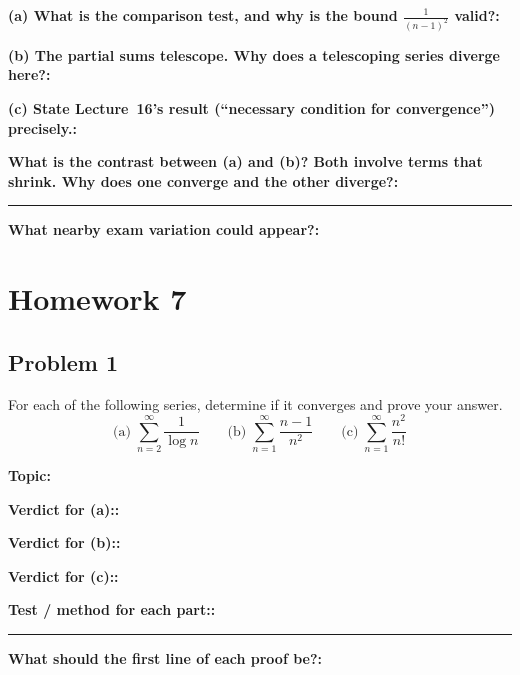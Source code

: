 \documentclass[12pt]{article}
\newcommand{\fillfield}[1]{%
  \par\noindent\textbf{#1:}\enspace\hrulefill\par\vspace{3pt}%
}
\newcommand{\fillfieldlong}[1]{%
  \par\noindent\textbf{#1:}\par\vspace{1.5cm}%
  \noindent\rule{\linewidth}{0.35pt}\par\vspace{4pt}%
}
\begin{document}
\begin{tcolorbox}[
  enhanced, breakable,
  colback  = reflectcyan,
  colframe = cyan!55!black,
  fonttitle = \bfseries,
  title = {\textsc{Reflection \& Variation}}
]
\fillfield{(a) What is the comparison test, and why is the bound $\frac{1}{(n-1)^2}$ valid?}
\fillfield{(b) The partial sums telescope. Why does a telescoping series diverge here?}
\fillfield{(c) State Lecture~16's result (``necessary condition for convergence'') precisely.}
\fillfieldlong{What is the contrast between (a) and (b)? Both involve terms that shrink. Why does one converge and the other diverge?}
\fillfield{What nearby exam variation could appear?}
\end{tcolorbox}

\newpage
\section{Homework 7}

\newpage
\subsection{Problem 1}

\begin{tcolorbox}[
  enhanced, breakable,
  colback  = probblue,
  colframe = blue!55!black,
  fonttitle = \bfseries,
  title = {\textsc{Problem Statement}\hfill Homework 7, Problem 1}
]
For each of the following series, determine if it converges and prove your answer.
\[
  \text{(a)}\;\sum_{n=2}^{\infty}\frac{1}{\log n}
  \qquad
  \text{(b)}\;\sum_{n=1}^{\infty}\frac{n-1}{n^2}
  \qquad
  \text{(c)}\;\sum_{n=1}^{\infty}\frac{n^2}{n!}
\]
\end{tcolorbox}

\bigskip

\begin{tcolorbox}[
  enhanced, breakable,
  colback  = pass1green,
  colframe = green!55!black,
  fonttitle = \bfseries,
  title = {Pass 1 \enspace\textbf{--}\enspace First Diagnosis}
]
\fillfield{Topic}
\fillfield{Verdict for (a):}
\fillfield{Verdict for (b):}
\fillfield{Verdict for (c):}
\fillfieldlong{Test / method for each part:}
\fillfield{What should the first line of each proof be?}
\end{tcolorbox}
\end{document}
